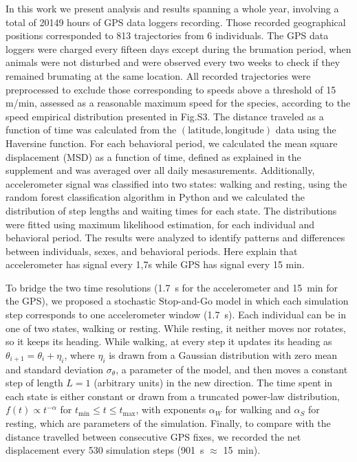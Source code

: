 \documentclass[a4paper]{article}
\begin{document}
In this work we present analysis and results spanning a whole year, involving a total of 20149 hours of GPS data loggers recording. Those recorded geographical positions corresponded to 813 trajectories from 6 individuals. The GPS data loggers were charged every fifteen days except during the brumation period, when animals were not disturbed and were observed every two weeks to check if they remained brumating at the same location. All recorded trajectories were preprocessed to exclude those corresponding to speeds above a threshold of 15 m/min, assessed as a reasonable maximum speed for the species, according to the speed empirical distribution presented in Fig.S3. The distance traveled as a function of time was calculated from the $(\mathrm{latitude}, \mathrm{longitude})$ data using the Haversine function.
For each behavioral period, we calculated the mean square displacement (MSD) as a function of time, defined as explained in the supplement and was averaged over all daily mesasurements.
Additionally, accelerometer signal was classified into two states: walking and resting, using the random forest classification algorithm in Python and we calculated the distribution of step lengths and waiting times for each state. The distributions were fitted using maximum likelihood estimation, for each individual and behavioral period. The results were analyzed to identify patterns and differences between individuals, sexes, and behavioral periods.
Here explain that accelerometer has signal every 1,7s while GPS has signal every 15 min. 

To bridge the two time resolutions (1.7~s for the accelerometer and 15~min for the GPS), we proposed a stochastic Stop-and-Go model in which each simulation step corresponds to one
accelerometer window (1.7~s). Each individual can be in one of two states, walking or resting. While resting, it neither moves nor rotates, so it keeps its heading. While walking,
at every step it updates its heading as $\theta_{i+1} = \theta_i + \eta_i$, where $\eta_i$ is drawn from a Gaussian distribution with zero mean and standard deviation $\sigma_\theta$, a
parameter of the model, and then moves a constant step of length $L = 1$ (arbitrary units) in the new direction. The time spent in each state is either constant or drawn from a
truncated power-law distribution, $f(t) \propto t^{-\alpha}$ for $t_{\min} \le t \le t_{\max}$, with exponents $\alpha_W$ for walking and $\alpha_S$ for
resting, which are parameters of the simulation. Finally, to compare with the distance travelled between consecutive GPS fixes, we recorded the net displacement every 530
simulation steps (901~s $\approx$ 15~min).
\end{document}

